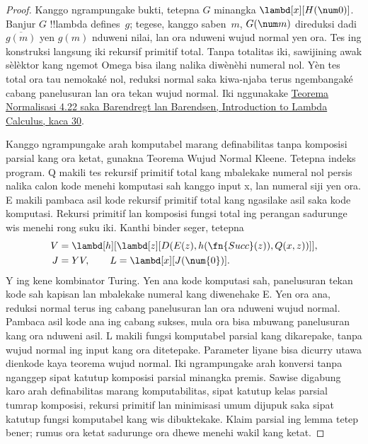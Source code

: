 \documentclass[../../../include/open-logic-section]{subfiles}
\begin{document}
\begin{proof}
Kanggo ngrampungake bukti, tetepna
$G$ minangka $\lambd[x][H(\num 0)]$.
Banjur $G$ !!{lambda define}s~$g$;
tegese, kanggo saben~$m$,
$G(\num m)$ direduksi dadi
$\overline {g(m)}$ yen $g(m)$
nduweni nilai, lan ora nduweni
wujud normal yen ora. Tes ing konstruksi langsung iki rekursif primitif total. Tanpa totalitas iki, sawijining awak sèlèktor kang ngemot Omega bisa ilang nalika diwènèhi numeral nol. Yèn tes total ora tau nemokaké nol, reduksi normal saka kiwa-njaba terus ngembangaké cabang panelusuran lan ora tekan wujud normal. Iki nggunakake \href{https://www.csc.kth.se/utbildning/kth/kurser/DD2471/moddb10/lankar/barendregt.94.pdf}{Teorema Normalisasi 4.22 saka Barendregt lan Barendsen, Introduction to Lambda Calculus, kaca 30}.
\par Kanggo ngrampungake arah komputabel marang definabilitas tanpa komposisi parsial kang ora ketat, gunakna Teorema Wujud Normal Kleene. Tetepna indeks program. Q makili tes rekursif primitif total kang mbalekake numeral nol persis nalika calon kode menehi komputasi sah kanggo input x, lan numeral siji yen ora. E makili pambaca asil kode rekursif primitif total kang ngasilake asil saka kode komputasi. Rekursi primitif lan komposisi fungsi total ing perangan sadurunge wis menehi rong suku iki. Kanthi binder seger, tetepna
\begin{align*}
V & = \lambd[h][\lambd[z][D(E(z),h(\fn{Succ}(z)),Q(x,z))]], \\
J & = YV, \qquad L = \lambd[x][J(\num{0})].
\end{align*}
Y ing kene kombinator Turing. Yen ana kode komputasi sah, panelusuran tekan kode sah kapisan lan mbalekake numeral kang diwenehake E. Yen ora ana, reduksi normal terus ing cabang panelusuran lan ora nduweni wujud normal. Pambaca asil kode ana ing cabang sukses, mula ora bisa mbuwang panelusuran kang ora nduweni asil. L makili fungsi komputabel parsial kang dikarepake, tanpa wujud normal ing input kang ora ditetepake. Parameter liyane bisa dicurry utawa dienkode kaya teorema wujud normal. Iki ngrampungake arah konversi tanpa nganggep sipat katutup komposisi parsial minangka premis. Sawise digabung karo arah definabilitas marang komputabilitas, sipat katutup kelas parsial tumrap komposisi, rekursi primitif lan minimisasi umum dijupuk saka sipat katutup fungsi komputabel kang wis dibuktekake. Klaim parsial ing lemma tetep bener; rumus ora ketat sadurunge ora dhewe menehi wakil kang ketat.
\end{proof}
\end{document}
